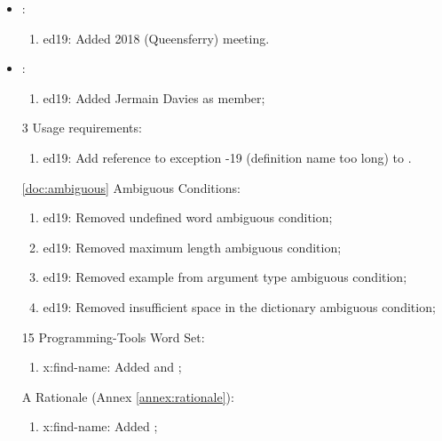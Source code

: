 \begin{itemize}
	\item {}:						%
	\begin{enumerate}
		\item \textsf{ed19}: Added 2018 (Queensferry) meeting.
	\end{enumerate}

	\item {}:					%
	\begin{enumerate}
		\item \textsf{ed19}: Added Jermain Davies as member;
	\end{enumerate}
	
	\item[3] Usage requirements:				%
	\begin{enumerate}
	\item \textsf{ed19}: Add reference to exception -19 (definition name too long) to
		.
	\end{enumerate}

	\item[\ref{doc:ambiguous}] Ambiguous Conditions:
	\begin{enumerate}
	\item \textsf{ed19}: Removed undefined word ambiguous condition;
	\item \textsf{ed19}: Removed maximum length ambiguous condition;
	\item \textsf{ed19}: Removed example from argument type ambiguous condition;
	\item \textsf{ed19}: Removed insufficient space in the dictionary ambiguous condition;
	\end{enumerate}

	\item[15] Programming-Tools Word Set:	%
	\begin{enumerate}
		\item \textsf{x:find-name:} Added  and ;
	\end{enumerate}

	\item[A] Rationale (Annex \ref{annex:rationale}):	%
	\begin{enumerate}
		\item \textsf{x:find-name:} Added ;
	\end{enumerate}


\end{itemize}
